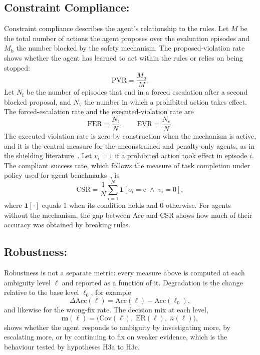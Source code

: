 \subsection{Constraint Compliance:}

Constraint compliance describes the agent's relationship to the rules. Let $M$ be the total number of actions the agent proposes over the evaluation episodes and $M_{\text{b}}$ the number blocked by the safety mechanism. The proposed-violation rate shows whether the agent has learned to act within the rules or relies on being stopped:
\begin{equation}
\text{PVR} = \frac{M_{\text{b}}}{M}.
\end{equation}
Let $N_{\text{f}}$ be the number of episodes that end in a forced escalation after a second blocked proposal, and $N_{\text{v}}$ the number in which a prohibited action takes effect. The forced-escalation rate and the executed-violation rate are
\begin{equation}
\text{FER} = \frac{N_{\text{f}}}{N}, \qquad
\text{EVR} = \frac{N_{\text{v}}}{N}.
\end{equation}
The executed-violation rate is zero by construction when the mechanism is active, and it is the central measure for the unconstrained and penalty-only agents, as in the shielding literature~\cite{alshiekh2018}. Let $v_i = 1$ if a prohibited action took effect in episode $i$. The compliant success rate, which follows the measure of task completion under policy used for agent benchmarks~\cite{levy2026}, is
\begin{equation}
\text{CSR} = \frac{1}{N}\sum_{i=1}^{N} \mathbf{1}\left[o_i = \text{c} \;\wedge\; v_i = 0\right],
\end{equation}
where $\mathbf{1}[\cdot]$ equals 1 when its condition holds and 0 otherwise. For agents without the mechanism, the gap between Acc and CSR shows how much of their accuracy was obtained by breaking rules.

\subsection{Robustness:}

Robustness is not a separate metric: every measure above is computed at each ambiguity level $\ell$ and reported as a function of it. Degradation is the change relative to the base level $\ell_0$, for example
\begin{equation}
\Delta\text{Acc}(\ell) = \text{Acc}(\ell) - \text{Acc}(\ell_0),
\end{equation}
and likewise for the wrong-fix rate. The decision mix at each level,
\begin{equation}
\mathbf{m}(\ell) = \big(\text{Cov}(\ell),\; \text{ER}(\ell),\; \bar{n}(\ell)\big),
\end{equation}
shows whether the agent responds to ambiguity by investigating more, by escalating more, or by continuing to fix on weaker evidence, which is the behaviour tested by hypotheses H3a to H3c.


